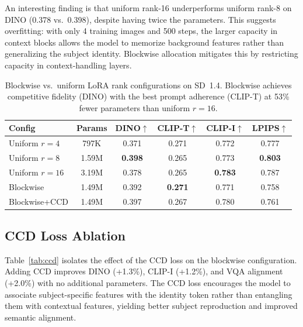\documentclass{article}
\begin{document}
An interesting finding is that uniform rank-16 underperforms uniform rank-8 on DINO (0.378 vs.\ 0.398), despite having twice the parameters.
This suggests overfitting: with only 4 training images and 500 steps, the larger capacity in context blocks allows the model to memorize background features rather than generalizing the subject identity.
Blockwise allocation mitigates this by restricting capacity in context-handling layers.

\begin{table}[t]
\caption{Blockwise vs.\ uniform LoRA rank configurations on SD~1.4.
Blockwise achieves competitive fidelity (DINO) with the best prompt adherence (CLIP-T) at 53\% fewer parameters than uniform $r{=}16$.}
\label{tab:blockwise}
\vskip 0.1in
\begin{center}
\begin{small}
\begin{tabular}{lccccc}
\toprule
Config & Params & DINO$\uparrow$ & CLIP-T$\uparrow$ & CLIP-I$\uparrow$ & LPIPS$\uparrow$ \\
\midrule
Uniform $r{=}4$ & 797K & 0.371 & 0.271 & 0.772 & 0.777 \\
Uniform $r{=}8$ & 1.59M & \textbf{0.398} & 0.265 & 0.773 & \textbf{0.803} \\
Uniform $r{=}16$ & 3.19M & 0.378 & 0.265 & \textbf{0.783} & 0.787 \\
Blockwise & 1.49M & 0.392 & \textbf{0.271} & 0.771 & 0.758 \\
Blockwise+CCD & 1.49M & 0.397 & 0.267 & 0.780 & 0.761 \\
\bottomrule
\end{tabular}
\end{small}
\end{center}
\vskip -0.1in
\end{table}

\subsection{CCD Loss Ablation}
\label{sec:ablation_ccd}

Table~\ref{tab:ccd} isolates the effect of the CCD loss on the blockwise configuration.
Adding CCD improves DINO (+1.3\%), CLIP-I (+1.2\%), and VQA alignment (+2.0\%) with no additional parameters.
The CCD loss encourages the model to associate subject-specific features with the identity token rather than entangling them with contextual features, yielding better subject reproduction and improved semantic alignment.
\end{document}
